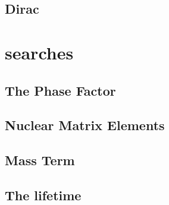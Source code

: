 \subsection{Dirac}
\begin{comment}
Discuss Dirac mechanism for mass
\end{comment}


\section{\zvbb searches}
\begin{comment}
Discuss \zvbb process and sensitivity to nature of neutrino.
Discuss concurrent sensitivity to hadron part
I feel like I should discuss ongoing searches but not in much detail?  Relevant information is: expected lifetime, mass, expected counts/year, expected limits?
Okay, yes.  Here is how this section could go: discuss the process and the resulting equation for the lifetime, and then talk about each of the components of the equation.  START with the discussion of the lifetime - can include details of ongoing experiments there.
\end{comment}


\subsection{The Phase Factor}
\begin{comment}
Explain the phase factor, calculate it
\end{comment}


\subsection{Nuclear Matrix Elements}
\begin{comment}
Explain the NME - discuss different methods of calculation - QRPA, shell model, IBM, pairing
discuss uncertainties
discuss nuclear physics information that could help pin them down?
\end{comment}


\subsection{Mass Term}
\begin{comment}
Explain the mass term
\end{comment}


\subsection{The lifetime}
\begin{comment}
Discuss some different experiments working on \zvbb and the limits that are currently se on lifetimes and the expected limit for next-generation experiments.
\end{comment}

%
% 
% 
